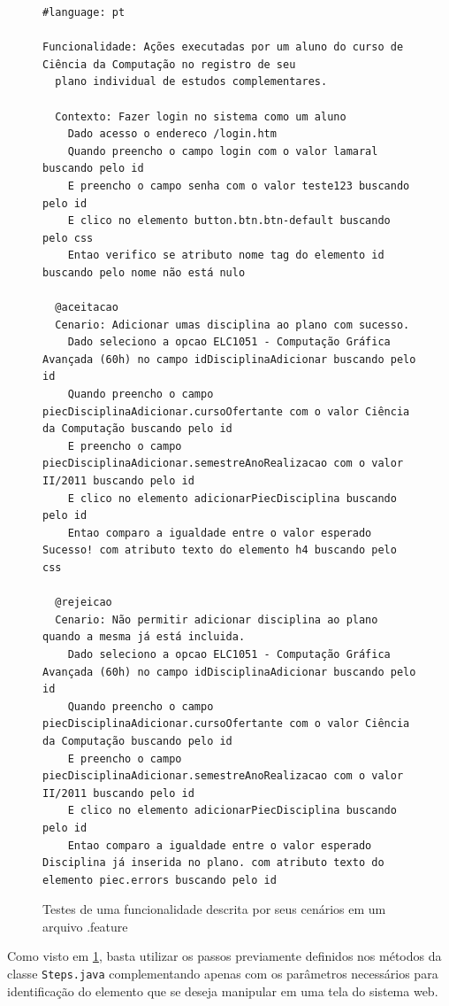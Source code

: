 \documentclass[tg]{mdtufsm}
\begin{document}
\begin{figure}[!htt]
	\begin{lstlisting}
#language: pt

Funcionalidade: Ações executadas por um aluno do curso de Ciência da Computação no registro de seu
  plano individual de estudos complementares.

  Contexto: Fazer login no sistema como um aluno
    Dado acesso o endereco /login.htm
    Quando preencho o campo login com o valor lamaral buscando pelo id
    E preencho o campo senha com o valor teste123 buscando pelo id
    E clico no elemento button.btn.btn-default buscando pelo css
    Entao verifico se atributo nome tag do elemento id buscando pelo nome não está nulo

  @aceitacao
  Cenario: Adicionar umas disciplina ao plano com sucesso.
    Dado seleciono a opcao ELC1051 - Computação Gráfica Avançada (60h) no campo idDisciplinaAdicionar buscando pelo id
    Quando preencho o campo piecDisciplinaAdicionar.cursoOfertante com o valor Ciência da Computação buscando pelo id
    E preencho o campo piecDisciplinaAdicionar.semestreAnoRealizacao com o valor II/2011 buscando pelo id
    E clico no elemento adicionarPiecDisciplina buscando pelo id
    Entao comparo a igualdade entre o valor esperado Sucesso! com atributo texto do elemento h4 buscando pelo css

  @rejeicao
  Cenario: Não permitir adicionar disciplina ao plano quando a mesma já está incluida.
    Dado seleciono a opcao ELC1051 - Computação Gráfica Avançada (60h) no campo idDisciplinaAdicionar buscando pelo id
    Quando preencho o campo piecDisciplinaAdicionar.cursoOfertante com o valor Ciência da Computação buscando pelo id
    E preencho o campo piecDisciplinaAdicionar.semestreAnoRealizacao com o valor II/2011 buscando pelo id
    E clico no elemento adicionarPiecDisciplina buscando pelo id
    Entao comparo a igualdade entre o valor esperado Disciplina já inserida no plano. com atributo texto do elemento piec.errors buscando pelo id
	\end{lstlisting}
	\caption{Testes de uma funcionalidade descrita por seus cenários em um arquivo .feature}
	\label{code:feature}
\end{figure}

Como visto em \ref{code:feature}, basta utilizar os passos previamente definidos nos métodos da classe \texttt{Steps.java} complementando apenas com os parâmetros necessários para identificação do elemento que se deseja manipular em uma tela do sistema web.
\end{document}
